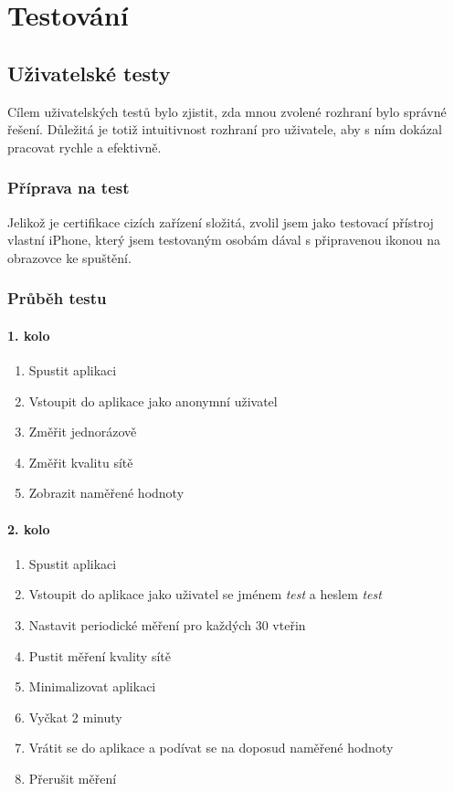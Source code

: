 \chapter{Testování}

\section{Uživatelské testy}
Cílem uživatelských testů bylo zjistit, zda mnou zvolené rozhraní bylo správné řešení. Důležitá je totiž intuitivnost rozhraní pro uživatele, aby s ním dokázal pracovat rychle a efektivně.

\subsection{Příprava na test}
Jelikož je certifikace cizích zařízení složitá, zvolil jsem jako testovací přístroj vlastní iPhone, který jsem testovaným osobám dával s připravenou ikonou na obrazovce ke spuštění.

\subsection{Průběh testu}

\subsubsection*{1. kolo}

\begin{enumerate}
	\item Spustit aplikaci
	\item Vstoupit do aplikace jako anonymní uživatel
	\item Změřit jednorázově
	\item Změřit kvalitu sítě
	\item Zobrazit naměřené hodnoty
\end{enumerate}

\subsubsection*{2. kolo}

\begin{enumerate}
	\item Spustit aplikaci
	\item Vstoupit do aplikace jako uživatel se jménem \emph{test} a heslem \emph{test}
	\item Nastavit periodické měření pro každých 30 vteřin
	\item Pustit měření kvality sítě
	\item Minimalizovat aplikaci
	\item Vyčkat 2 minuty
	\item Vrátit se do aplikace a podívat se na doposud naměřené hodnoty
	\item Přerušit měření
\end{enumerate}

